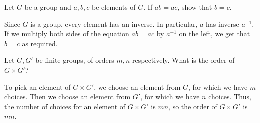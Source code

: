 \documentclass{zupan}
\begin{document}
\begin{exercise}{1}
  Let $G$ be a group and $a, b, c$ be elements of $G$. If $ab = ac$, show that
  $b = c$.
\end{exercise}

\begin{solution}
  Since $G$ is a group, every element has an inverse. In particular, $a$ has
  inverse $a^{-1}$. If we multiply both sides of the equation $ab = ac$ by
  $a^{-1}$ on the left, we get that $b = c$ as required.
\end{solution}

\begin{exercise}{2}
  Let $G, G'$ be finite groups, of orders $m, n$ respectively. What is the
  order of $G \times G'$?
\end{exercise}

\begin{solution}
  To pick an element of $G \times G'$, we choose an element from $G$, for which
  we have $m$ choices. Then we choose an element from $G'$, for which we have
  $n$ choices. Thus, the number of choices for an element of $G \times G'$ is
  $mn$, so the order of $G \times G'$ is $mn$.
\end{solution}
\end{document}
